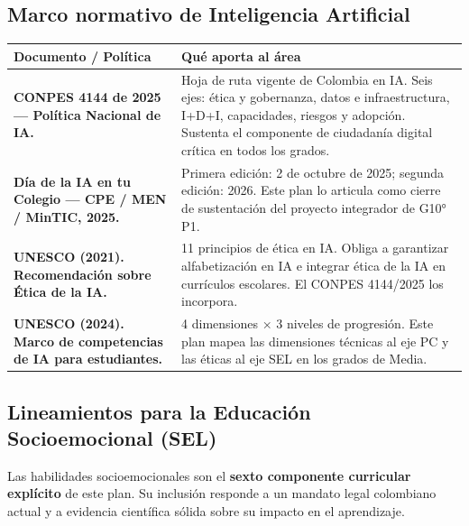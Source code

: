 \documentclass[12pt, a4paper]{article}
\begin{document}
\subsection{Marco normativo de Inteligencia Artificial}

\begin{longtable}{|L{6.5cm}|L{7.5cm}|}
\hline
{}
\color{white}\textbf{Documento / Política} &
\color{white}\textbf{Qué aporta al área} \\
\hline
\endhead
\textbf{CONPES 4144 de 2025 — Política Nacional de IA.} &
Hoja de ruta vigente de Colombia en IA. Seis ejes: ética y gobernanza,
datos e infraestructura, I+D+I, capacidades, riesgos y adopción.
Sustenta el componente de ciudadanía digital crítica en todos los grados. \\
\hline
\textbf{Día de la IA en tu Colegio — CPE / MEN / MinTIC, 2025.} &
Primera edición: 2 de octubre de 2025; segunda edición: 2026.
Este plan lo articula como cierre de sustentación del proyecto integrador
de G10° P1. \\
\hline
\textbf{UNESCO (2021). Recomendación sobre Ética de la IA.} &
11 principios de ética en IA. Obliga a garantizar alfabetización en IA
e integrar ética de la IA en currículos escolares. El CONPES 4144/2025
los incorpora. \\
\hline
\textbf{UNESCO (2024). Marco de competencias de IA para estudiantes.} &
4 dimensiones × 3 niveles de progresión. Este plan mapea las dimensiones
técnicas al eje PC y las éticas al eje SEL en los grados de Media. \\
\hline
\end{longtable}

\subsection{Lineamientos para la Educación Socioemocional (SEL)}

Las habilidades socioemocionales son el \textbf{sexto componente curricular
explícito} de este plan. Su inclusión responde a un mandato legal colombiano
actual y a evidencia científica sólida sobre su impacto en el aprendizaje.
\end{document}
